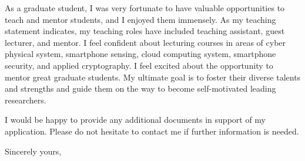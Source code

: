 \documentclass[11pt]{letter} %
\begin{document}
\begin{letter}{}
As a graduate student, I was very fortunate to have valuable opportunities to teach and mentor students, and I enjoyed them immensely. As my teaching statement indicates, my teaching roles have included teaching assistant, guest lecturer, and mentor. I feel confident about lecturing courses in areas of cyber physical system, smartphone sensing, cloud computing system, smartphone security, and applied cryptography. I feel excited about the opportunity to mentor great graduate students. My ultimate goal is to foster their diverse talents and strengths and guide them on the way to become self-motivated leading researchers. %

I would be happy to provide any additional documents in support of my application. Please do not hesitate to contact me if further information is needed. 

\closing{Sincerely yours,}




\end{letter}
\end{document}
